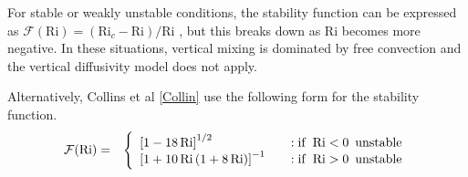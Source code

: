 For stable or weakly unstable conditions, the stability function can be expressed as
$\mathcal{F}(\mathrm{Ri}) = (\mathrm{Ri}_c-\mathrm{Ri})/\mathrm{Ri}$ \cite{Jacobson2005}, %
but this breaks down as $\mathrm{Ri}$ becomes more negative. In these situations, vertical mixing
is dominated by free convection and the vertical diffusivity model does not apply.

Alternatively, Collins et al \ref{Collin} use the following form for the stability function.
\begin{eqnarray}\label{VarDiff_Eq_F_Collins}
\mathcal{F}(\mathrm{Ri}) &=& \left\{ \begin{array} {l@{\quad \quad}l}
 \left[ 1 -18 \, \mathrm{Ri} \right]^{1/2}                         &: \mathrm{if}\,\,\, \mathrm{Ri} < 0 \,\,\, \mathrm{unstable} \\
 \left[ 1+ 10 \, \mathrm{Ri} \, (1+8 \, \mathrm{Ri}) \right]^{-1}  &: \mathrm{if}\,\,\, \mathrm{Ri} > 0 \,\,\, \mathrm{unstable}
\end{array}
\right.
\end{eqnarray}


